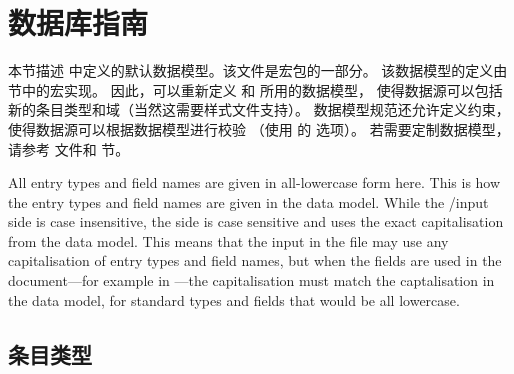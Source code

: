 \section{数据库指南}
\label{bib}
本节描述  中定义的默认数据模型。该文件是宏包的一部分。
该数据模型的定义由 节中的宏实现。
因此，可以重新定义 \biblatex 和 \biber 所用的数据模型，
使得数据源可以包括新的\gls{条目类型}和\gls{域}（当然这需要\gls{样式}文件支持）。
数据模型规范还允许定义约束，使得数据源可以根据数据模型进行校验
（使用 \biber 的  选项）。
若需要定制数据模型，请参考  文件和  节。


All entry types and field names are given in all-lowercase form here. This is how the entry types and field names are given in the data model. While the \biber/\bibtex input side is case insensitive, the \latex side is case sensitive and uses the exact capitalisation from the data model. This means that the input in the  file may use any capitalisation of entry types and field names, but when the fields are used in the \latex document---for example in ---the capitalisation must match the captalisation in the data model, for standard types and fields that would be all lowercase.
\subsection{条目类型}
\label{bib:typ}

